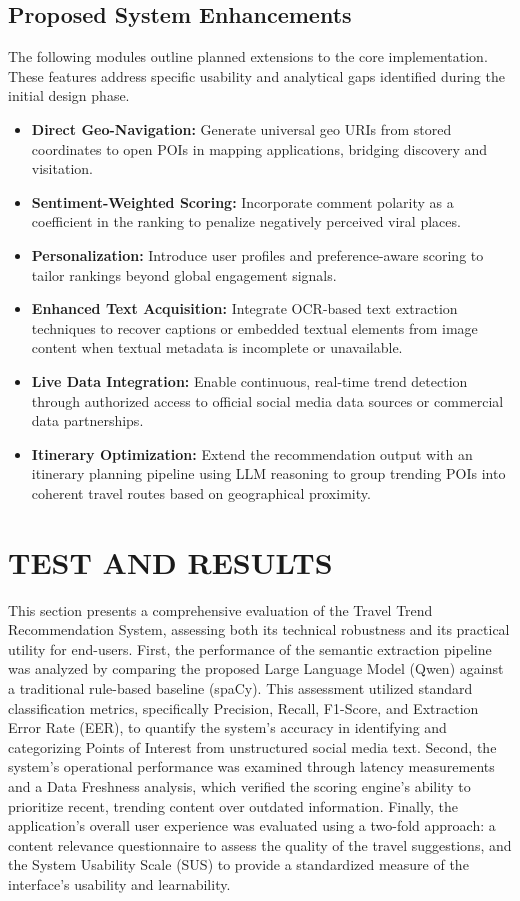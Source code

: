\documentclass[a4paper,12pt]{report}
\begin{document}
\section{Proposed System Enhancements}

The following modules outline planned extensions to the core implementation. These features address specific usability and analytical gaps identified during the initial design phase.
\begin{itemize}
\item \textbf{Direct Geo-Navigation:} Generate universal geo URIs from stored coordinates to open POIs in mapping applications, bridging discovery and visitation.
\item \textbf{Sentiment-Weighted Scoring:} Incorporate comment polarity as a coefficient in the ranking to penalize negatively perceived viral places.
\item \textbf{Personalization:} Introduce user profiles and preference-aware scoring to tailor rankings beyond global engagement signals.
\item \textbf{Enhanced Text Acquisition:} Integrate OCR-based text extraction techniques to recover captions or embedded textual elements from image content when textual metadata is incomplete or unavailable.
\item \textbf{Live Data Integration:} Enable continuous, real-time trend detection through authorized access to official social media data sources or commercial data partnerships.
\item \textbf{Itinerary Optimization:} Extend the recommendation output with an itinerary planning pipeline using LLM reasoning to group trending POIs into coherent travel routes based on geographical proximity.
\end{itemize}


\chapter{TEST AND RESULTS}
This section presents a comprehensive evaluation of the Travel Trend Recommendation System, assessing both its technical robustness and its practical utility for end-users. First, the performance of the semantic extraction pipeline was analyzed by comparing the proposed Large Language Model (Qwen) against a traditional rule-based baseline (spaCy). This assessment utilized standard classification metrics, specifically Precision, Recall, F1-Score, and Extraction Error Rate (EER), to quantify the system’s accuracy in identifying and categorizing Points of Interest from unstructured social media text. Second, the system’s operational performance was examined through latency measurements and a Data Freshness analysis, which verified the scoring engine’s ability to prioritize recent, trending content over outdated information. Finally, the application’s overall user experience was evaluated using a two-fold approach: a content relevance questionnaire to assess the quality of the travel suggestions, and the System Usability Scale (SUS) to provide a standardized measure of the interface’s usability and learnability.
\end{document}
